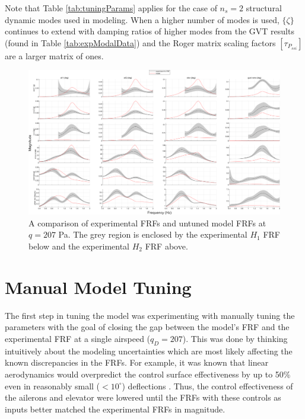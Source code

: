 Note that Table \ref{tab:tuningParams} applies for the case of $n_s=2$ structural dynamic modes used in modeling. When a higher number of modes is used, $\{\zeta\}$ continues to extend with damping ratios of higher modes from the GVT results (found in Table \ref{tab:expModalData}) and the Roger matrix scaling factors $[\tau_{P_{ssi}}]$ are a larger matrix of ones.

\begin{landscape}

\begin{figure}[H]
	\centering
	\includegraphics[width=9in]{figs/FRFcompare_noTune_q207.png}
	\caption{A comparison of experimental FRFs and untuned model FRFs at $q=207$ Pa. The grey region is enclosed by the experimental $H_1$ FRF below and the experimental $H_2$ FRF above.}
	\label{fig:noTuneFRF}
\end{figure}

\end{landscape}

\section{Manual Model Tuning} %
\label{sec:manualTuning}

The first step in tuning the model was experimenting with manually tuning the parameters with the goal of closing the gap between the model's FRF and the experimental FRF at a single airspeed ($q_D=207$). This was done by thinking intuitively about the modeling uncertainties which are most likely affecting the known discrepancies in the FRFs. For example, it was known that linear aerodynamics would overpredict the control surface effectiveness by up to 50\% even in reasonably small ($<10^\circ$) deflections \cite{Young1947,Riebe1955}. Thus, the control effectiveness of the ailerons and elevator were lowered until the FRFs with these controls as inputs better matched the experimental FRFs in magnitude.

